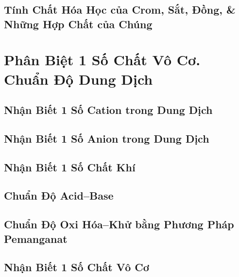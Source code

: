 \documentclass{article}
\numberwithin{equation}{section}
\begin{document}
\subsection{Tính Chất Hóa Học của Crom, Sắt, Đồng, \& Những Hợp Chất của Chúng}


\section{Phân Biệt 1 Số Chất Vô Cơ. Chuẩn Độ Dung Dịch}

\subsection{Nhận Biết 1 Số Cation trong Dung Dịch}


\subsection{Nhận Biết 1 Số Anion trong Dung Dịch}


\subsection{Nhận Biết 1 Số Chất Khí}


\subsection{Chuẩn Độ Acid--Base}


\subsection{Chuẩn Độ Oxi Hóa--Khử bằng Phương Pháp Pemanganat}


\subsection{Nhận Biết 1 Số Chất Vô Cơ}
\end{document}
